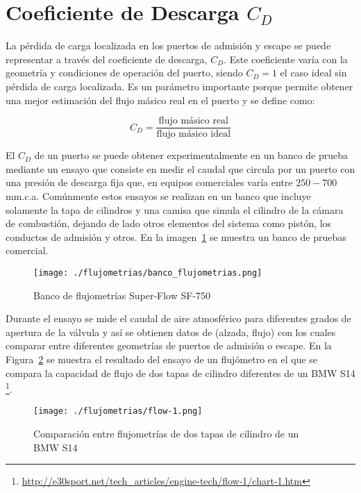 
\section{Coeficiente de Descarga $C_{D}$}\label{sec:cap2_cd}
%
La pérdida de carga localizada en los puertos de admisión y escape se puede
representar a través del coeficiente de descarga, $C_{D}$.
%
Este coeficiente varía con la geometría y condiciones de operación del puerto,
siendo $C_{D}=1$ el caso ideal sin pérdida de carga localizada.
%
Es un parámetro importante porque permite obtener una mejor estimación del flujo
másico real en el puerto y se define como:

\begin{equation}
  C_{D} = \frac{\text{flujo másico real}}{\text{flujo másico ideal}}
\end{equation}

El $C_{D}$ de un puerto se puede obtener experimentalmente en un banco de prueba
mediante un ensayo que consiste en medir el caudal que circula por un puerto con
una presión de descarga fija que, en equipos comerciales varía entre $250-700$
mm.c.a.
%
Comúnmente estos ensayos se realizan en un banco que incluye solamente la tapa
de cilindros y una camisa que simula el cilindro de la cámara de combustión,
dejando de lado otros elementos del sistema como pistón, los conductos de
admisión y otros.
%
En la imagen~\ref{fig:banco_flujometrias} se muestra un banco de pruebas
comercial.

\begin{figure} \centering
\texttt{[image: ./flujometrias/banco\_flujometrias.png]}
  \caption{Banco de flujometrías Super-Flow SF-750}\label{fig:banco_flujometrias}
\end{figure}

Durante el ensayo se mide el caudal de aire atmosférico para diferentes grados
de apertura de la válvula y así se obtienen datos de (alzada, flujo) con los
cuales comparar entre diferentes geometrías de puertos de admisión o escape.
%
En la Figura~\ref{fig:flow-1} se muestra el resultado del ensayo de un
flujómetro en el que se compara la capacidad de flujo de dos tapas de cilindro
diferentes de un BMW S14
\footnote{\url{http://e30sport.net/tech_articles/engine-tech/flow-1/chart-1.htm}}.

\begin{figure} \centering
\texttt{[image: ./flujometrias/flow-1.png]}
  \caption{Comparación entre flujometrías de dos tapas de cilindro de un BMW S14}\label{fig:flow-1}
\end{figure}

